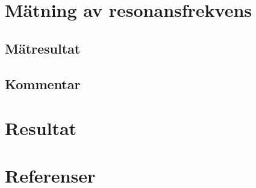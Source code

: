 \documentclass[11pt,a4paper]{article}
\begin{document}
\section{Mätning av resonansfrekvens}\label{}

\subsection{Mätresultat}\label{}

\subsection{Kommentar}\label{}


\section{Resultat}\label{setup}

\newpage

\section{Referenser}\label{refs}

\end{document}
